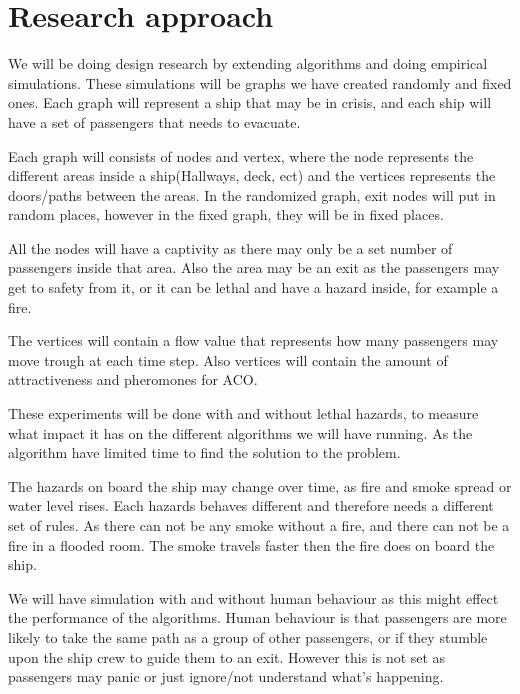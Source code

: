 \chapter{Research approach}
\label{ch:approach}




We will be doing design research by extending algorithms and doing empirical simulations. These simulations will be graphs we have created randomly and fixed ones. Each graph will represent a ship that may be in crisis, and each ship will have a set of passengers that needs to evacuate.



Each graph will consists of nodes and vertex, where the node represents the different areas inside a ship(Hallways, deck, ect) and the vertices represents the doors/paths between the areas. In the randomized graph, exit nodes will put in random places, however in the fixed graph, they will be in fixed places. 

All the nodes will have a captivity as there may only be a set number of passengers inside that area. Also the area may be an exit as the passengers may get to safety from it, or it can be lethal and have a hazard inside, for example a fire.

The vertices will contain a flow value that represents how many passengers may move trough at each time step. Also vertices will contain the amount of attractiveness and pheromones for ACO.

These experiments will be done with and without lethal hazards, to measure what impact it has on the different algorithms we will have running. As the algorithm have limited time to find the solution to the problem.

The hazards on board the ship may change over time, as fire and smoke spread or water level rises. Each hazards behaves different and therefore needs a different set of rules. As there can not be any smoke without a fire, and there can not be a fire in a flooded room. The smoke travels faster then the fire does on board the ship.

We will have simulation with and without human behaviour as this might effect the performance of the algorithms. Human behaviour is that passengers are more likely to take the same path as a group of other passengers, or if they stumble upon the ship crew to guide them to an exit. However this is not set as passengers may panic or just ignore/not understand what's happening.

